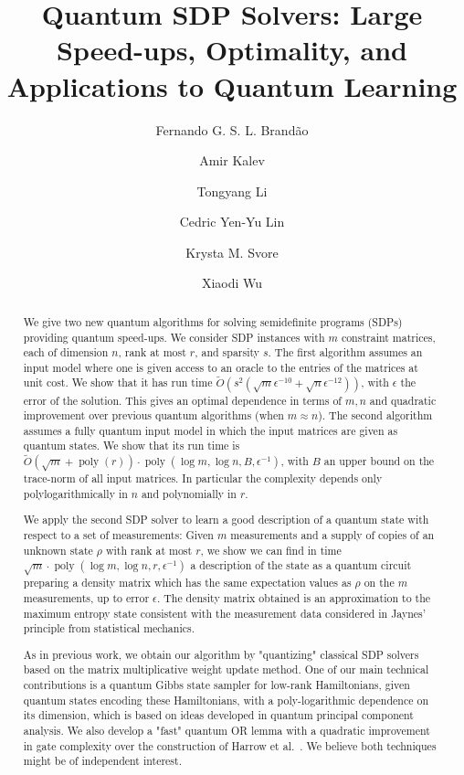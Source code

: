 \documentclass[a4paper,UKenglish,cleveref, autoref]{lipics-v2019}
\title{Quantum SDP Solvers: Large Speed-ups, Optimality, and Applications to Quantum Learning} %
\author{Fernando G. S. L. Brand\~{a}o}{Institute of Quantum Information and Matter, California Institute of Technology, USA}{fgslbrandao@gmail.com}{}{}%
\author{Amir Kalev}{Joint Center for Quantum Information and Computer Science, University of Maryland, USA}{amirk@umd.edu}{}{}
\author{Tongyang Li}{Joint Center for Quantum Information and Computer Science, University of Maryland, USA}{tongyang@cs.umd.edu}{}{}
\author{Cedric Yen-Yu Lin}{Joint Center for Quantum Information and Computer Science, University of Maryland, USA}{cedriclin37@gmail.com}{}{}
\author{Krysta M. Svore}{Station Q, Quantum Architectures and Computation Group, Microsoft Research, USA}{ksvore@microsoft.com}{}{}
\author{Xiaodi Wu}{Joint Center for Quantum Information and Computer Science, University of Maryland, USA}{xwu@cs.umd.edu}{}{}
\theoremstyle{remark}
\numberwithin{equation}{section}
\numberwithin{oracle}{section}
\numberwithin{remark}{section}
\DeclareMathOperator{\poly}{poly}
\begin{document}
\maketitle

\begin{abstract}
We give two new quantum algorithms for solving semidefinite programs (SDPs) providing quantum speed-ups. We consider SDP instances with $m$ constraint matrices, each of dimension $n$, rank at most $r$, and sparsity $s$. The first algorithm assumes an input model where one is given access to an oracle to the entries of the matrices at unit cost. We show that it has run time $\tilde{O}(s^2 (\sqrt{m} \epsilon^{-10} + \sqrt{n} \epsilon^{-12}))$, with $\epsilon$ the error of the solution. This gives an optimal dependence in terms of $m, n$ and quadratic improvement over previous quantum algorithms (when $m \approx n$). The second algorithm assumes a fully quantum input model in which the input matrices are given as quantum states. We show that its run time is $\tilde{O}(\sqrt{m}+\poly(r))\cdot\poly(\log m,\log n,B,\epsilon^{-1})$, with $B$ an upper bound on the trace-norm of all input matrices. In particular the complexity depends only polylogarithmically in $n$ and polynomially in $r$.

We apply the second SDP solver to learn a good description of a quantum state with respect to a set of measurements: Given $m$ measurements and a supply of copies of an unknown state $\rho$ with rank at most $r$, we show we can find in time $\sqrt{m}\cdot\poly(\log m,\log n,r,\epsilon^{-1})$ a description of the state as a quantum circuit preparing a density matrix which has the same expectation values as $\rho$ on the $m$ measurements, up to error $\epsilon$. The density matrix obtained is an approximation to the maximum entropy state consistent with the measurement data considered in Jaynes' principle from statistical mechanics.

As in previous work, we obtain our algorithm by "quantizing" classical SDP solvers based on the matrix multiplicative weight update method. One of our main technical contributions is a quantum Gibbs state sampler for low-rank Hamiltonians, given quantum states encoding these Hamiltonians, with a poly-logarithmic dependence on its dimension, which is based on ideas developed in quantum principal component analysis. We also develop a "fast" quantum OR lemma with a quadratic improvement in gate complexity over the construction of Harrow et al.~\cite{harrow2017sequential}. We believe both techniques might be of independent interest.
\end{abstract}
\end{document}
